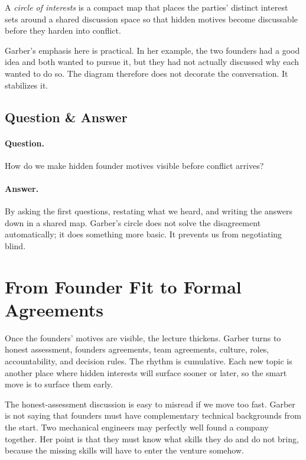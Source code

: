 \begin{definition}
A \emph{circle of interests} is a compact map that places the parties' distinct interest sets around a shared discussion space so that hidden motives become discussable before they harden into conflict.
\end{definition}

Garber's emphasis here is practical. In her example, the two founders had a good idea and both wanted to pursue it, but they had not actually discussed why each wanted to do so. The diagram therefore does not decorate the conversation. It stabilizes it.

\subsection{Question \& Answer}

\paragraph{Question.} How do we make hidden founder motives visible before conflict arrives?

\paragraph{Answer.} By asking the first questions, restating what we heard, and writing the answers down in a shared map. Garber's circle does not solve the disagreement automatically; it does something more basic. It prevents us from negotiating blind.

\section{From Founder Fit to Formal Agreements}

Once the founders' motives are visible, the lecture thickens. Garber turns to honest assessment, founders agreements, team agreements, culture, roles, accountability, and decision rules. The rhythm is cumulative. Each new topic is another place where hidden interests will surface sooner or later, so the smart move is to surface them early.

The honest-assessment discussion is easy to misread if we move too fast. Garber is not saying that founders must have complementary technical backgrounds from the start. Two mechanical engineers may perfectly well found a company together. Her point is that they must know what skills they do and do not bring, because the missing skills will have to enter the venture somehow.

